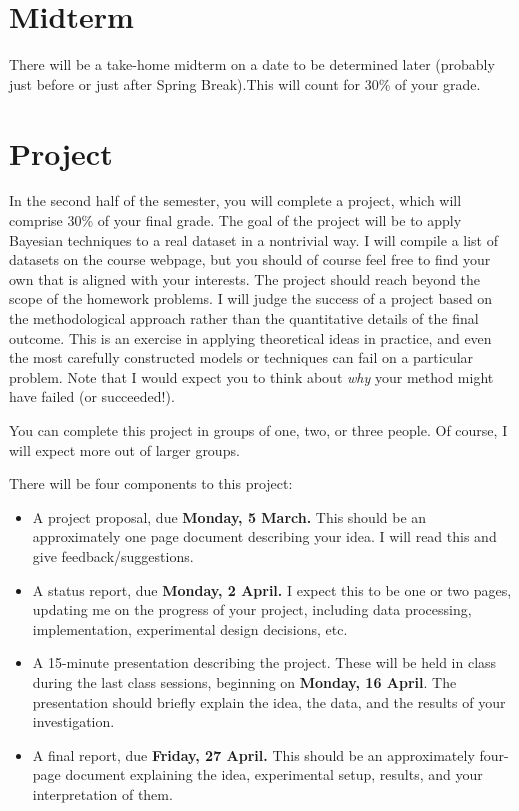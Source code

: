 \documentclass{article}
\begin{document}
\section*{Midterm}

There will be a take-home midterm on a date to be determined later (probably
just before or just after Spring Break).This will count for 30\% of your grade.

\section*{Project}

In the second half of the semester, you will complete a project, which will
comprise 30\% of your final grade. The goal of the project will be to apply
Bayesian techniques to a real dataset in a nontrivial way.  I will compile a
list of datasets on the course webpage, but you should of course feel free to
find your own that is aligned with your interests.  The project should reach
beyond the scope of the homework problems.  I will judge the success of a
project based on the methodological approach rather than the quantitative
details of the final outcome.  This is an exercise in applying theoretical ideas
in practice, and even the most carefully constructed models or techniques can
fail on a particular problem.  Note that I would expect you to think about
\emph{why} your method might have failed (or succeeded!).

You can complete this project in groups of one, two, or three people.  Of
course, I will expect more out of larger groups.

There will be four components to this project:
\begin{itemize}
\item A project proposal, due \textbf{Monday, 5 March.}  This should be an
  approximately one page document describing your idea.  I will read this and
  give feedback/suggestions.
\item A status report, due \textbf{Monday, 2 April.}  I expect this to be one
  or two pages, updating me on the progress of your project, including data
  processing, implementation, experimental design decisions, etc.
\item A 15-minute presentation describing the project.  These will be held in
  class during the last class sessions, beginning on \textbf{Monday, 16 April}.
  The presentation should briefly explain the idea, the data, and the results of
  your investigation.
\item A final report, due \textbf{Friday, 27 April.}  This should be an
  approximately four-page document explaining the idea, experimental setup,
  results, and your interpretation of them.
\end{itemize}
\end{document}
